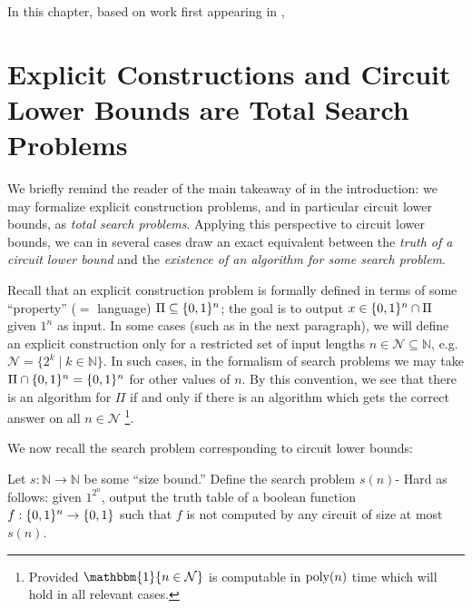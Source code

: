 In this chapter, based on work first appearing in \cite{Korten}, 

\section{Explicit Constructions and Circuit Lower Bounds are Total Search Problems}\label{range:sec:explicit-constructions-and-lower-bounds}

We briefly remind the reader of the main takeaway of  in the introduction: we may formalize explicit construction problems, and in particular circuit lower bounds, as \emph{total search problems}. Applying this perspective to circuit lower bounds, we can in several cases draw an exact equivalent between the \emph{truth of a circuit lower bound} and the \emph{existence of an algorithm for some search problem}. 

Recall that an explicit construction problem is formally defined in terms of some ``property'' ($=$ language) $\Pi \subseteq \{0,1\}^n$; the goal is to output $x \in \{0,1\}^n \cap \Pi$ given $1^n$ as input. In some cases (such as in the next paragraph), we will define an explicit construction only for a restricted set of input lengths $n \in \mathcal{N} \subseteq \mathbb{N}$, e.g. $\mathcal{N} = \{ 2^k \mid k \in \mathbb{N}\}$. In such cases, in the formalism of search problems we may take $\Pi \cap \{0,1\}^n = \{0,1\}^n$ for other values of $n$. By this convention, we see that there is an algorithm for $\Pi$ if and only if there is an algorithm which gets the correct answer on all $n \in \mathcal{N} $ \footnote{Provided $\mathbbm{1}\{ n \in \mathcal{N} \}$ is computable in $\mathrm{poly}(n)$ time which will hold in all relevant cases.}. 

We now recall  the search problem corresponding to circuit lower bounds:
\begin{definition}\label{range:def:s-hard}
Let $s: \mathbb{N} \to \mathbb{N}$ be some ``size bound.'' Define the search problem {\sc $s(n)$- Hard} as follows: given $1^{2^n}$, output the truth table of a boolean function $f: \{0,1\}^n \to \{0,1\}$ such that $f$ is not computed by any circuit of size at most $s(n)$.
\end{definition}

